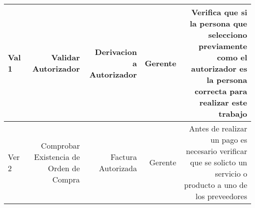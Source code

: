 \begin{longtable}{|llrrrrrr|}
	\multicolumn{2}{|m{3cm}|}{Val 1} & \multicolumn{1}{m{2cm}|}{Validar Autorizador} & \multicolumn{1}{m{2.2cm}|}{Derivacion a Autorizador} & \multicolumn{1}{m{2cm}|}{Gerente} & \multicolumn{3}{m{4cm}|}{Verifica que si la persona que selecciono previamente como el autorizador es la persona correcta para realizar este trabajo} \\ \hline
		
	\multicolumn{2}{|m{3cm}|}{Ver 2} & \multicolumn{1}{m{2cm}|}{Comprobar Existencia de Orden de Compra} & \multicolumn{1}{m{2.2cm}|}{Factura Autorizada} & \multicolumn{1}{m{2cm}|}{Gerente} & \multicolumn{3}{m{4cm}|}{Antes de realizar un pago es necesario verificar que se solicto un servicio o producto a uno de los preveedores} \\ \hline
\end{longtable}
